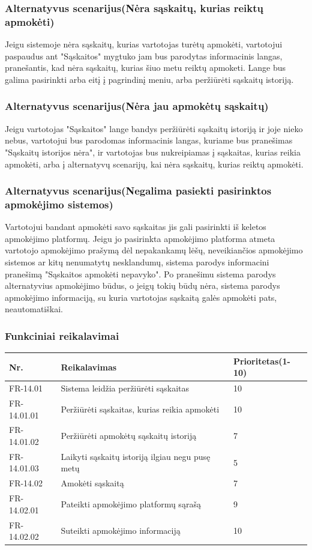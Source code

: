 \documentclass[oneside]{VUMIFPSkursinis}
\begin{document}
	\subsubsection{Alternatyvus scenarijus(Nėra sąskaitų, kurias reiktų apmokėti)}
	Jeigu sistemoje nėra sąskaitų, kurias vartotojas turėtų apmokėti, vartotojui paspaudus ant "Sąskaitos" mygtuko jam bus parodytas informacinis langas, pranešantis, kad nėra sąskaitų, kurias šiuo metu reiktų apmoketi. Lange bus galima pasirinkti arba eitį į pagrindinį meniu, arba peržiūrėti sąskaitų istoriją.
	\subsubsection{Alternatyvus scenarijus(Nėra jau apmokėtų sąskaitų)}
	Jeigu vartotojas "Sąskaitos" lange bandys peržiūrėti sąskaitų istoriją ir joje nieko nebus, vartotojui bus parodomas informacinis langas, kuriame bus pranešimas "Sąskaitų istorijos nėra", ir vartotojas bus nukreipiamas į sąskaitas, kurias reikia apmokėti, arba į alternatyvų scenarijų, kai nėra sąskaitų, kurias reiktų apmokėti.
	\subsubsection{Alternatyvus scenarijus(Negalima pasiekti pasirinktos apmokėjimo sistemos)}
	Vartotojui bandant apmokėti savo sąskaitas jis gali pasirinkti iš keletos apmokėjimo platformų. Jeigu jo pasirinkta apmokėjimo platforma atmeta vartotojo apmokėjimo prašymą dėl nepakankamų lėšų, neveikiančios apmokėjimo sistemos ar kitų nenumatytų nesklandumų, sistema parodys informacini pranešimą "Sąskaitos apmokėti nepavyko". Po pranešimu sistema parodys alternatyvius apmokėjimo būdus, o jeigų tokių būdų nėra, sistema parodys apmokėjimo informaciją, su kuria vartotojas sąskaitą galės apmokėti pats, neautomatiškai.
	\subsubsection{Funkciniai reikalavimai}
\begin{table}[htbp]
	\begin{tabularx}{1\textwidth}{ |P{2.5cm}|X|P{3cm }| }  \hline
		Nr. & Reikalavimas & Prioritetas(1-10) \\ \hline
		FR-14.01 & Sistema leidžia peržiūrėti sąskaitas & 10 \\ \hline
		FR-14.01.01& Peržiūrėti sąskaitas, kurias reikia apmokėti & 10 \\ \hline
		FR-14.01.02 & Peržiūrėti apmokėtų sąskaitų istoriją & 7 \\ \hline 
		FR-14.01.03 & Laikyti sąskaitų istoriją ilgiau negu pusę metų & 5 \\ \hline
		FR-14.02 & Amokėti sąskaitą & 7 \\ \hline
		FR-14.02.01 & Pateikti apmokėjimo platformų sąrašą & 9 \\ \hline
		FR-14.02.02 & Suteikti apmokėjimo informaciją & 10 \\ \hline
	\end{tabularx}
\end{table}
\end{document}
